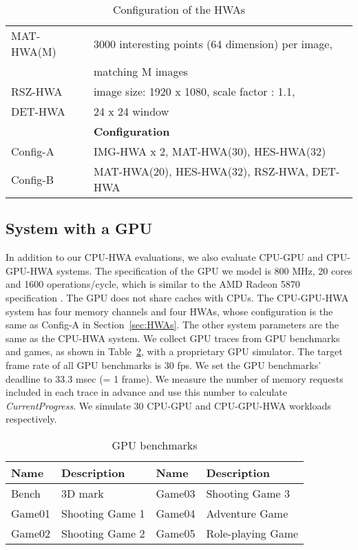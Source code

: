 \documentclass[10pt,letterpaper]{article}
\begin{document}
\begin{table}[t!]
\begin{tabular}{|l|l|l|l|}
    \hline
    MAT-HWA(M) & \multicolumn{3}{l|}{ 3000 interesting points (64 dimension) per
    image,} \\
    ~\cite{mra} & \multicolumn{3}{l|}{matching M images} \\
    \hline
    RSZ-HWA & \multicolumn{3}{l|}{ image size: 1920 x 1080, scale factor : 1.1,} \\
    DET-HWA~\cite{opencv} & \multicolumn{3}{l|}{ 24 x 24 window } \\
    \hline
    \hline
    & \multicolumn{3}{l|}{\textbf{Configuration}} \\
    \hline
    Config-A & \multicolumn{3}{l|}{ IMG-HWA x 2, MAT-HWA(30), HES-HWA(32) } \\
    \hline
    Config-B & \multicolumn{3}{l|}{ MAT-HWA(20), HES-HWA(32), RSZ-HWA, DET-HWA } \\
    \hline
  \end{tabular}
  \vspace{-2mm}
  \caption{Configuration of the HWAs}
  \label{tab:hwa_env}
\vspace{-2mm}
\end{table}

\subsection{System with a GPU}
In addition to our CPU-HWA evaluations, we also evaluate CPU-GPU
and CPU-GPU-HWA systems. The specification of the GPU we model is
800 MHz, 20 cores and 1600 operations/cycle, which is similar to
the AMD Radeon 5870 specification \cite{amd-radeon}. The GPU does
not share caches with CPUs. The CPU-GPU-HWA system has four memory
channels and four HWAs, whose configuration is the same as Config-A
in Section~\ref{sec:HWAs}. The other system parameters are the
same as the CPU-HWA system. We collect GPU traces from GPU
benchmarks and games, as shown in Table~\ref{tab:gpu-bench}, with
a proprietary GPU simulator. The target frame rate of all GPU
benchmarks is 30 fps. We set the GPU benchmarks' deadline to 33.3
msec (= 1 frame). 
We measure the number of memory requests included in each trace in advance and
use this number to calculate \emph{CurrentProgress}. We simulate 
30 CPU-GPU and CPU-GPU-HWA workloads respectively.



\begin{table}[h!]
\footnotesize
  \centering
  \begin{tabular}{|l|l||l|l|}
    \hline
    Name & Description & Name & Description \\
    \hline
    \hline
    Bench & 3D mark & Game03 & Shooting Game 3 \\
    \hline
    Game01 & Shooting Game 1 & Game04 & Adventure Game \\
    \hline
    Game02 & Shooting Game 2 & Game05 & Role-playing Game \\
    \hline
  \end{tabular}
  \vspace{-2mm}
  \caption{GPU benchmarks}
  \label{tab:gpu-bench}
\end{table}
\end{document}
